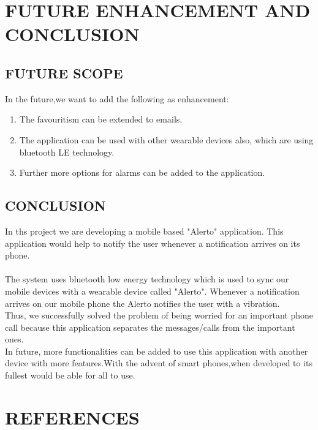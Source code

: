 \documentclass[12pt,a4paper]{report}
\begin{document}
\chapter{\bf{FUTURE ENHANCEMENT AND CONCLUSION}}
\newpage

\section{FUTURE SCOPE}
In the future,we want to add the following as enhancement:
\begin{enumerate}
	\item The favouritism can be extended to emails.
	\item The application can be used with other wearable devices also, which are using bluetooth LE technology.
	 \item Further more options for alarms can be added to the application.
\end{enumerate}

\section{CONCLUSION}
\hspace{0.5in}In ths project we are developing a mobile based "Alerto" application. This application would help to notify the user whenever a notification arrives on its phone.\\\\
The system uses bluetooth low energy technology which is used to sync our mobile devices with a wearable device called "Alerto". Whenever a notification arrives on our mobile phone the Alerto notifies the user with a vibration.\\

Thus, we successfully solved the problem of being worried for an important phone call because this application separates the messages/calls from the important ones.\\

In future, more functionalities can be added to use this application with another device with more features.With the advent of smart phones,when developed to its fullest would be able for all to use.


\chapter{REFERENCES}
\newpage

 
\end{document}

